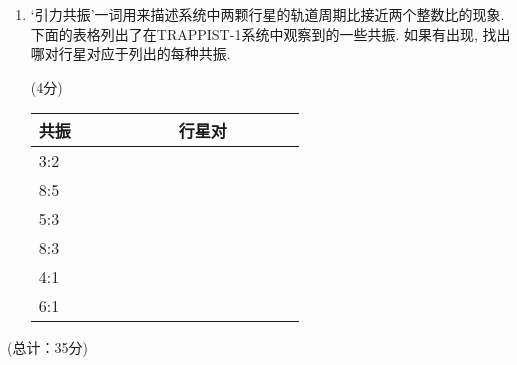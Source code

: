 \documentclass[a4paper,fontset=fandol]{ctexart}
\newcommand{\points}[1]{\par %
	\noindent %
	\hfill (#1分)%
	\vspace{1em}
	}
\begin{document}
\begin{enumerate}[label=(\alph*)]
		\item ‘引力共振’一词用来描述系统中两颗行星的轨道周期比接近两个整数比的现象. 下面的表格列出了在TRAPPIST-1系统中观察到的一些共振. 如果有出现, 找出哪对行星对应于列出的每种共振. \points{4}
		
		\vspace{0em}
		\begin{center}
			\begin{tabular}{|l|l|}
				\hline
				共振~~~~~~~~~~&行星对~~~~~~~\\
				\hline
				3:2&\\
				\hline
				8:5&\\
				\hline
				5:3&\\
				\hline
				8:3&\\
				\hline
				4:1&\\
				\hline
				6:1&\\
				\hline
			\end{tabular}
		\end{center}
		\end{enumerate}
		\points{总计：35}
	
\end{document}
